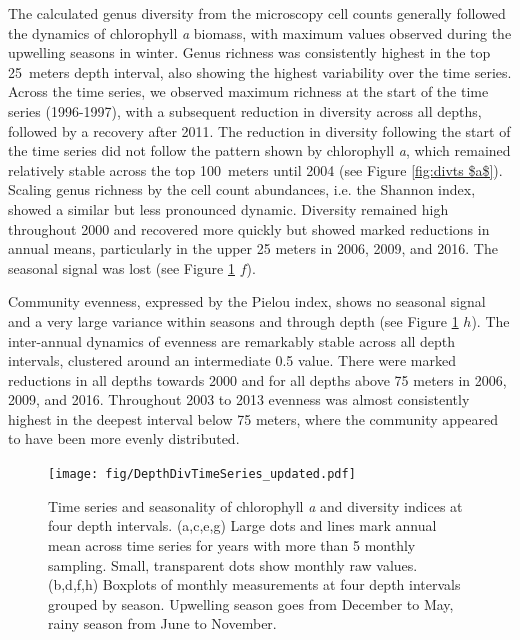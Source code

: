 \documentclass[draft]{agujournal2019}
\begin{document}
    The calculated genus diversity from the microscopy cell counts generally followed the dynamics of chlorophyll \textit{a} biomass, with maximum values observed during the upwelling seasons in winter. Genus richness was consistently highest in the top \qty{25}{meters} depth interval, also showing the highest variability over the time series. Across the time series, we observed maximum richness at the start of the time series (1996-1997), with a subsequent reduction in diversity across all depths, followed by a recovery after 2011. The reduction in diversity following the start of the time series did not follow the pattern shown by chlorophyll \textit{a}, which remained relatively stable across the top \qty{100}{meters} until 2004 (see Figure \ref{fig:divts $a$}). Scaling genus richness by the cell count abundances, i.e. the Shannon index, showed a similar but less pronounced dynamic. Diversity remained high throughout 2000 and recovered more quickly but showed marked reductions in annual means, particularly in the upper 25 meters in 2006, 2009, and 2016. The seasonal signal was lost (see Figure \ref{fig:divts} $f$). 
    
    Community evenness, expressed by the Pielou index, shows no seasonal signal and a very large variance within seasons and through depth (see Figure \ref{fig:divts} $h$). The inter-annual dynamics of evenness are remarkably stable across all depth intervals, clustered around an intermediate 0.5 value. There were marked reductions in all depths towards 2000 and for all depths above 75 meters in 2006, 2009, and 2016. Throughout 2003 to 2013 evenness was almost consistently highest in the deepest interval below 75 meters, where the community appeared to have been more evenly distributed. 
    
    \begin{figure}
    \begin{center}
    \noindent\texttt{[image: fig/DepthDivTimeSeries\_updated.pdf]}
    \end{center}
    \caption{Time series and seasonality of chlorophyll \textit{a} and diversity indices at four depth intervals. (a,c,e,g) Large dots and lines mark annual mean across time series for years with more than 5 monthly sampling. Small, transparent dots show monthly raw values. (b,d,f,h) Boxplots of monthly measurements at four depth intervals grouped by season. Upwelling season goes from December to May, rainy season from June to November.}
    \label{fig:divts}
    \end{figure}
\end{document}
